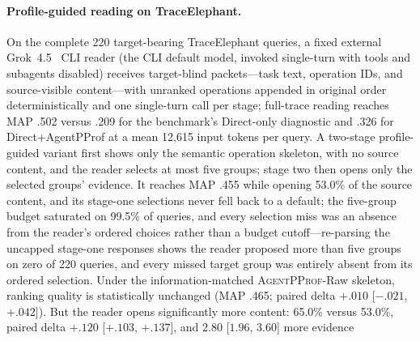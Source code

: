 \documentclass[letterpaper]{article}
\newcommand{\sys}{\textsc{AgentPProf}\xspace}
\begin{document}
\paragraph{Profile-guided reading on TraceElephant.}
On the complete 220 target-bearing TraceElephant queries, a fixed external
Grok~4.5~\cite{grok45} CLI reader (the CLI default model, invoked
single-turn with tools and subagents disabled) receives target-blind packets---task text, operation
IDs, and source-visible content---with unranked operations appended in
original order deterministically and one single-turn call per stage; full-trace
reading reaches MAP .502 versus .209 for the benchmark's Direct-only diagnostic
and .326 for Direct+AgentPProf at a mean 12{,}615 input tokens per query.
A two-stage profile-guided variant first shows only the semantic operation
skeleton, with no source content, and the reader selects at most five groups;
stage two then opens only the selected groups' evidence.
It reaches MAP .455 while opening 53.0\% of the source content, and its
stage-one selections never fell back to a default; the five-group budget
saturated on 99.5\% of queries, and every selection miss was an absence from
the reader's ordered choices rather than a budget cutoff---re-parsing the
uncapped stage-one responses shows the reader proposed more than five groups
on zero of 220 queries, and every missed target group was entirely absent
from its ordered selection.
Under the information-matched \sys-Raw skeleton, ranking quality is
statistically unchanged (MAP .465; paired delta $+.010$ [$-.021$, $+.042$]).
But the reader opens significantly more content: 65.0\% versus 53.0\%, paired
delta $+.120$ [$+.103$, $+.137$], and $2.80$ [$1.96$, $3.60$] more evidence
\end{document}
